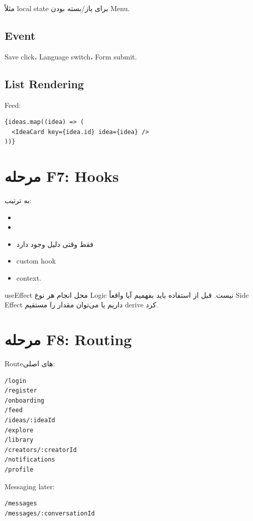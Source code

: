 مثلاً local state برای باز/بسته بودن Menu.

\subsection{Event}

Save click، Language switch، Form submit.

\subsection{List Rendering}

Feed:
\begin{latin}
\begin{lstlisting}
{ideas.map((idea) => (
  <IdeaCard key={idea.id} idea={idea} />
))}
\end{lstlisting}
\end{latin}

\section{مرحله F7: Hooks}

به ترتیب:
\begin{itemize}
  \item {}
  \item {}
  \item {} فقط وقتی دلیل وجود دارد
  \item custom hook
  \item context.
\end{itemize}

\begin{warningbox}
useEffect محل انجام هر نوع Logic نیست. قبل از استفاده باید بفهمیم آیا واقعاً Side Effect داریم یا می‌توان مقدار را مستقیم derive کرد.
\end{warningbox}

\section{مرحله F8: Routing}

Routeهای اصلی:
\begin{latin}
\begin{lstlisting}
/login
/register
/onboarding
/feed
/ideas/:ideaId
/explore
/library
/creators/:creatorId
/notifications
/profile
\end{lstlisting}
\end{latin}

Messaging later:
\begin{latin}
\begin{lstlisting}
/messages
/messages/:conversationId
\end{lstlisting}
\end{latin}

